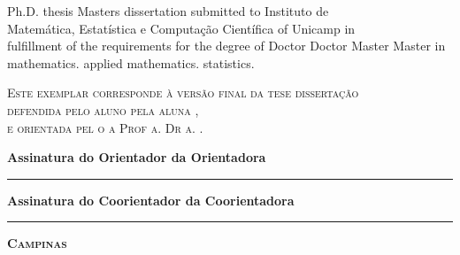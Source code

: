 \begin{flushright}
  \begin{minipage}[c]{.8\textwidth}
    \begin{flushright}
      \ifx\mestrado\undefined
      Ph.D. thesis
      \else
      Masters dissertation
      \fi
      submitted to Instituto de \\ Matem\'atica,
      Estat\'istica e Computa\c c\~ao Cient\'ifica
      of Unicamp in \\
      fulfillment of the requirements for the degree of
      \ifx\mestrado\undefined
      \ifx\femaleAuthor\undefined
      Doctor
      \else
      Doctor
      \fi
      \else
      \ifx\femaleAuthor\undefined
      Master
      \else
      Master
      \fi
      \fi
      in
      \ifx\matematica\undefined
      \else
      mathematics.
      \fi
      \ifx\aplicada\undefined
      \else
      applied mathematics.
      \fi
      \ifx\estatistica\undefined
      \else
      statistics.
      \fi
    \end{flushright}
  \end{minipage}
\end{flushright}

\vspace{.2cm}
\noindent
{\footnotesize \scshape
Este exemplar corresponde à versão final da 
\ifx\mestrado\undefined
tese
\else
dissertação
\fi \\
defendida 
\ifx\femaleAuthor\undefined
pelo aluno
\else
pela aluna
\fi
\autor,\\
e orientada pel\ifx\femaleOrientador\undefined
o\else
a\fi{} Prof\ifx\femaleOrientador\undefined
\else
a\fi. Dr\ifx\femaleOrientador\undefined
\else
a\fi. \orientador.
}
\vspace{.5cm}

\noindent
{\small \bfseries
\noindent
Assinatura
\ifx\femaleOrientador\undefined
do Orientador
\else
da Orientadora
\fi

\vspace{.4cm}
\noindent
\rule[1pt]{7cm}{.5pt}  %
}
\vspace{.4cm}

\ifx\coorientador\undefined
\else
{\small \bfseries
\noindent
Assinatura
\ifx\femaleCoorientador\undefined
do Coorientador
\else
da Coorientadora
\fi

\vspace{.4cm}
\noindent
\rule[1pt]{7cm}{.5pt}  %
}
\fi
\vfill
\begin{center}
  {\small \scshape \bfseries Campinas \\ \ano}
\end{center}
